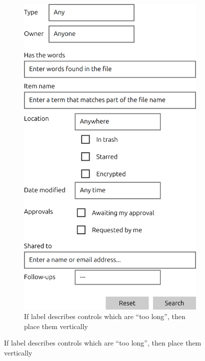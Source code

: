 \begin{figure}[t]
    \begin{subfigure}[t]{.45\textwidth}
        \vspace{-18em}
        \centering
        \begin{minipage}{6cm}
        \includegraphics[scale=0.25]{google-drive-search-setting-output2.png}
        \end{minipage}
        \caption{If label describes controls which are ``too long'', then place them vertically}

\end{subfigure}
\end{figure}
